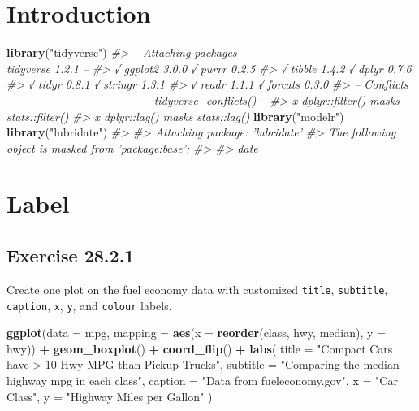 \documentclass[]{book}
\newenvironment{Shaded}{\begin{snugshade}}{\end{snugshade}}
\newcommand{\CommentTok}[1]{\textcolor[rgb]{0.56,0.35,0.01}{\textit{#1}}}
\newcommand{\DataTypeTok}[1]{\textcolor[rgb]{0.13,0.29,0.53}{#1}}
\newcommand{\KeywordTok}[1]{\textcolor[rgb]{0.13,0.29,0.53}{\textbf{#1}}}
\newcommand{\NormalTok}[1]{#1}
\newcommand{\OperatorTok}[1]{\textcolor[rgb]{0.81,0.36,0.00}{\textbf{#1}}}
\newcommand{\StringTok}[1]{\textcolor[rgb]{0.31,0.60,0.02}{#1}}
\theoremstyle{plain}
\theoremstyle{remark}
\theoremstyle{definition}
\theoremstyle{definition}
\theoremstyle{definition}
\theoremstyle{remark}
\begin{document}
\hypertarget{introduction-18}{%
\section{Introduction}\label{introduction-18}}

\begin{Shaded}
\begin{Highlighting}[]
\KeywordTok{library}\NormalTok{(}\StringTok{"tidyverse"}\NormalTok{)}
\CommentTok{#> -- Attaching packages ---------------------------------- tidyverse 1.2.1 --}
\CommentTok{#> √ ggplot2 3.0.0     √ purrr   0.2.5}
\CommentTok{#> √ tibble  1.4.2     √ dplyr   0.7.6}
\CommentTok{#> √ tidyr   0.8.1     √ stringr 1.3.1}
\CommentTok{#> √ readr   1.1.1     √ forcats 0.3.0}
\CommentTok{#> -- Conflicts ------------------------------------- tidyverse_conflicts() --}
\CommentTok{#> x dplyr::filter() masks stats::filter()}
\CommentTok{#> x dplyr::lag()    masks stats::lag()}
\KeywordTok{library}\NormalTok{(}\StringTok{"modelr"}\NormalTok{)}
\KeywordTok{library}\NormalTok{(}\StringTok{"lubridate"}\NormalTok{)}
\CommentTok{#> }
\CommentTok{#> Attaching package: 'lubridate'}
\CommentTok{#> The following object is masked from 'package:base':}
\CommentTok{#> }
\CommentTok{#>     date}
\end{Highlighting}
\end{Shaded}

\hypertarget{label}{%
\section{Label}\label{label}}

\hypertarget{exercise-28.2.1}{%
\subsection*{\texorpdfstring{Exercise
{28.2.1}}{Exercise 28.2.1}}\label{exercise-28.2.1}}

Create one plot on the fuel economy data with customized \texttt{title},
\texttt{subtitle}, \texttt{caption}, \texttt{x}, \texttt{y}, and
\texttt{colour} labels.

\begin{Shaded}
\begin{Highlighting}[]
\KeywordTok{ggplot}\NormalTok{(}\DataTypeTok{data =}\NormalTok{ mpg,}
       \DataTypeTok{mapping =} \KeywordTok{aes}\NormalTok{(}\DataTypeTok{x =} \KeywordTok{reorder}\NormalTok{(class, hwy, median), }\DataTypeTok{y =}\NormalTok{ hwy)) }\OperatorTok{+}
\StringTok{  }\KeywordTok{geom_boxplot}\NormalTok{() }\OperatorTok{+}
\StringTok{  }\KeywordTok{coord_flip}\NormalTok{() }\OperatorTok{+}
\StringTok{  }\KeywordTok{labs}\NormalTok{(}
    \DataTypeTok{title =} \StringTok{"Compact Cars have > 10 Hwy MPG than Pickup Trucks"}\NormalTok{,}
    \DataTypeTok{subtitle =} \StringTok{"Comparing the median highway mpg in each class"}\NormalTok{,}
    \DataTypeTok{caption =} \StringTok{"Data from fueleconomy.gov"}\NormalTok{,}
    \DataTypeTok{x =} \StringTok{"Car Class"}\NormalTok{,}
    \DataTypeTok{y =} \StringTok{"Highway Miles per Gallon"}
\NormalTok{  )}
\end{Highlighting}
\end{Shaded}
\end{document}
